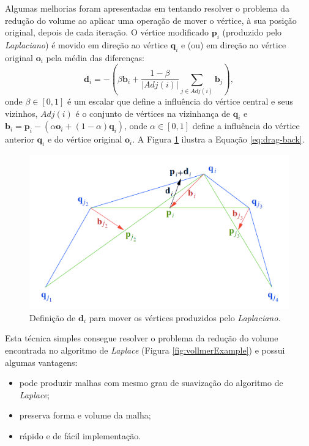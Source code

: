 Algumas melhorias foram apresentadas em \cite{vollmer1999improved} tentando resolver o problema da redução do volume ao aplicar uma operação de mover o vértice, à sua posição original, depois de cada iteração. O vértice modificado $\mathbf{p}_i$ (produzido pelo \textit{Laplaciano}) é movido em direção ao vértice $\mathbf{q}_i$ e (ou) em direção ao vértice original $\mathbf{o}_i$ pela média das diferenças:
\begin{equation} \label{eq:drag-back}
    \mathbf{d}_i = -(\beta \mathbf{b}_i + \frac{1 - \beta}{|Adj(i)|} \sum_{j \in Adj(i)}{\mathbf{b}_j}),
\end{equation}
onde $\beta \in [0,1]$ é um escalar que define a influência do vértice central e seus vizinhos, $Adj(i)$ é o conjunto de vértices na vizinhança de $\mathbf{q}_i$ e $\mathbf{b}_i = \mathbf{p}_i - (\alpha \mathbf{o}_i + (1 - \alpha)\mathbf{q}_i)$, onde $\alpha \in [0,1]$ define a influência do vértice anterior $\mathbf{q}_i$ e do vértice original $\mathbf{o}_i$. A Figura \ref{fig:drag-back} ilustra a Equação \ref{eq:drag-back}.

\begin{figure}[!h]
\captionsetup{width=\linewidth}
\centering
\includegraphics[scale=0.45]{figuras/drag-back-op.png}
\caption{Definição de $\mathbf{d}_i$ para mover os vértices produzidos pelo \textit{Laplaciano}.}
\label{fig:drag-back}
\end{figure}

Esta técnica simples consegue resolver o problema da redução do volume encontrada no algoritmo de \textit{Laplace} (Figura \ref{fig:vollmerExample}) e possui algumas vantagens:
\begin{itemize}
    \item pode produzir malhas com mesmo grau de suavização do algoritmo de \textit{Laplace};
    \item preserva forma e volume da malha;
    \item rápido e de fácil implementação.
\end{itemize}

